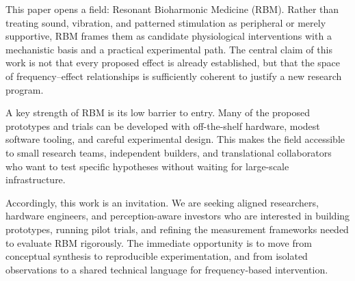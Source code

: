 This paper opens a field: Resonant Bioharmonic Medicine (RBM). Rather than treating sound, vibration, and patterned stimulation as peripheral or merely supportive, RBM frames them as candidate physiological interventions with a mechanistic basis and a practical experimental path. The central claim of this work is not that every proposed effect is already established, but that the space of frequency--effect relationships is sufficiently coherent to justify a new research program.

A key strength of RBM is its low barrier to entry. Many of the proposed prototypes and trials can be developed with off-the-shelf hardware, modest software tooling, and careful experimental design. This makes the field accessible to small research teams, independent builders, and translational collaborators who want to test specific hypotheses without waiting for large-scale infrastructure.

Accordingly, this work is an invitation. We are seeking aligned researchers, hardware engineers, and perception-aware investors who are interested in building prototypes, running pilot trials, and refining the measurement frameworks needed to evaluate RBM rigorously. The immediate opportunity is to move from conceptual synthesis to reproducible experimentation, and from isolated observations to a shared technical language for frequency-based intervention.
